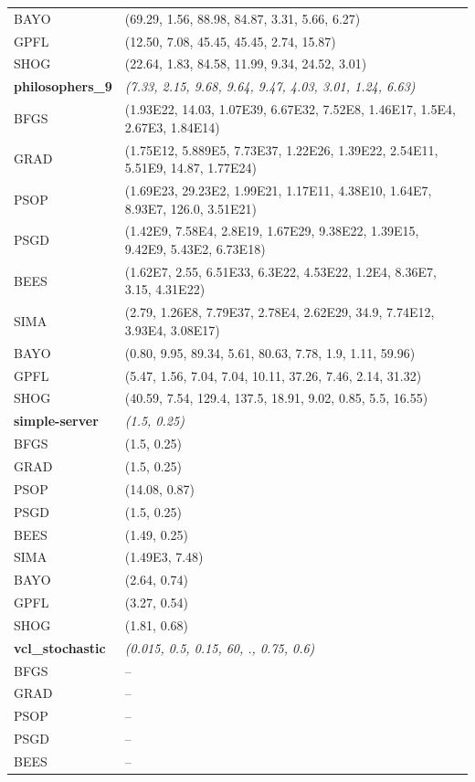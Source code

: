 \begin{table}
\begin{tabular}{ll}
		BAYO & (69.29, 1.56, 88.98, 84.87, 3.31, 5.66, 6.27)\\
		GPFL & (12.50, 7.08, 45.45, 45.45, 2.74, 15.87)\\
		SHOG & (22.64, 1.83, 84.58, 11.99, 9.34, 24.52, 3.01)\\
		\hline
		\textbf{philosophers\_9} & \textit{(7.33, 2.15, 9.68, 9.64, 9.47, 4.03, 3.01, 1.24, 6.63)}\\
		\hline
		BFGS & (1.93E22, 14.03, 1.07E39, 6.67E32, 7.52E8, 1.46E17, 1.5E4, 2.67E3, 1.84E14)\\
		GRAD & (1.75E12, 5.889E5, 7.73E37, 1.22E26, 1.39E22, 2.54E11, 5.51E9, 14.87, 1.77E24)\\
		PSOP & (1.69E23, 29.23E2, 1.99E21, 1.17E11, 4.38E10, 1.64E7, 8.93E7, 126.0, 3.51E21)\\
		PSGD & (1.42E9, 7.58E4, 2.8E19, 1.67E29, 9.38E22, 1.39E15, 9.42E9, 5.43E2, 6.73E18)\\
		BEES & (1.62E7, 2.55, 6.51E33, 6.3E22, 4.53E22, 1.2E4, 8.36E7, 3.15, 4.31E22)\\
		SIMA & (2.79, 1.26E8, 7.79E37, 2.78E4, 2.62E29, 34.9, 7.74E12, 3.93E4, 3.08E17)\\
		BAYO & (0.80, 9.95, 89.34, 5.61, 80.63, 7.78, 1.9, 1.11, 59.96)\\
		GPFL & (5.47, 1.56, 7.04, 7.04, 10.11, 37.26, 7.46, 2.14, 31.32)\\
		SHOG & (40.59, 7.54, 129.4, 137.5, 18.91, 9.02, 0.85, 5.5, 16.55)\\
		\hline
		\textbf{simple-server} & \textit{(1.5, 0.25)}\\
		\hline
		BFGS & (1.5, 0.25)\\
		GRAD & (1.5, 0.25)\\
		PSOP & (14.08, 0.87)\\
		PSGD & (1.5, 0.25)\\
		BEES & (1.49, 0.25)\\
		SIMA & (1.49E3, 7.48)\\
		BAYO & (2.64, 0.74)\\
		GPFL & (3.27, 0.54)\\
		SHOG & (1.81, 0.68)\\
		\hline
		\textbf{vcl\_stochastic} & \textit{(0.015, 0.5, 0.15, 60, ., 0.75, 0.6)}\\
		\hline
		BFGS & --\\
		GRAD & --\\
		PSOP & --\\
		PSGD & --\\
		BEES & --\\

\end{tabular}
\end{table}
